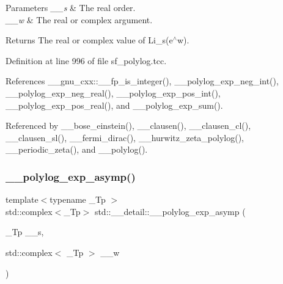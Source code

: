 \begin{DoxyParams}{Parameters}
{\em \+\_\+\+\_\+s} & The real order. \\
\hline
{\em \+\_\+\+\_\+w} & The real or complex argument. \\
\hline
\end{DoxyParams}
\begin{DoxyReturn}{Returns}
The real or complex value of Li\+\_\+s(e$^\wedge$w). 
\end{DoxyReturn}


Definition at line 996 of file sf\+\_\+polylog.\+tcc.



References \+\_\+\+\_\+gnu\+\_\+cxx\+::\+\_\+\+\_\+fp\+\_\+is\+\_\+integer(), \+\_\+\+\_\+polylog\+\_\+exp\+\_\+neg\+\_\+int(), \+\_\+\+\_\+polylog\+\_\+exp\+\_\+neg\+\_\+real(), \+\_\+\+\_\+polylog\+\_\+exp\+\_\+pos\+\_\+int(), \+\_\+\+\_\+polylog\+\_\+exp\+\_\+pos\+\_\+real(), and \+\_\+\+\_\+polylog\+\_\+exp\+\_\+sum().



Referenced by \+\_\+\+\_\+bose\+\_\+einstein(), \+\_\+\+\_\+clausen(), \+\_\+\+\_\+clausen\+\_\+cl(), \+\_\+\+\_\+clausen\+\_\+sl(), \+\_\+\+\_\+fermi\+\_\+dirac(), \+\_\+\+\_\+hurwitz\+\_\+zeta\+\_\+polylog(), \+\_\+\+\_\+periodic\+\_\+zeta(), and \+\_\+\+\_\+polylog().

\mbox{\label{namespacestd_1_1____detail_af3684fc449da490e9a43985245618a90}} 
\subsubsection{\texorpdfstring{\+\_\+\+\_\+polylog\+\_\+exp\+\_\+asymp()}{\_\_polylog\_exp\_asymp()}}
{\footnotesize\ttfamily template$<$typename \+\_\+\+Tp $>$ \\
std\+::complex$<$\+\_\+\+Tp$>$ std\+::\+\_\+\+\_\+detail\+::\+\_\+\+\_\+polylog\+\_\+exp\+\_\+asymp (\begin{DoxyParamCaption}\item[{\+\_\+\+Tp}]{\+\_\+\+\_\+s,  }\item[{std\+::complex$<$ \+\_\+\+Tp $>$}]{\+\_\+\+\_\+w }\end{DoxyParamCaption})}

